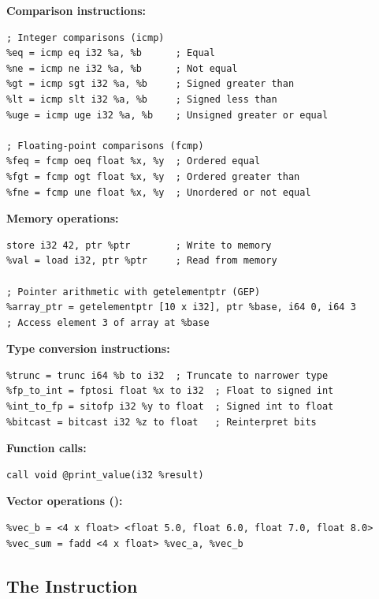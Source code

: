 \textbf{Comparison instructions:}

\begin{lstlisting}[style=ir]
; Integer comparisons (icmp)
%eq = icmp eq i32 %a, %b      ; Equal
%ne = icmp ne i32 %a, %b      ; Not equal
%gt = icmp sgt i32 %a, %b     ; Signed greater than
%lt = icmp slt i32 %a, %b     ; Signed less than
%uge = icmp uge i32 %a, %b    ; Unsigned greater or equal

; Floating-point comparisons (fcmp)
%feq = fcmp oeq float %x, %y  ; Ordered equal
%fgt = fcmp ogt float %x, %y  ; Ordered greater than
%fne = fcmp une float %x, %y  ; Unordered or not equal
\end{lstlisting}

\textbf{Memory operations:}

\begin{lstlisting}[style=ir]
%ptr = alloca i32             ; Stack allocation
store i32 42, ptr %ptr        ; Write to memory
%val = load i32, ptr %ptr     ; Read from memory

; Pointer arithmetic with getelementptr (GEP)
%array_ptr = getelementptr [10 x i32], ptr %base, i64 0, i64 3
; Access element 3 of array at %base
\end{lstlisting}

\textbf{Type conversion instructions:}

\begin{lstlisting}[style=ir]
%ext = zext i32 %a to i64     ; Zero-extend to wider type
%trunc = trunc i64 %b to i32  ; Truncate to narrower type
%fp_to_int = fptosi float %x to i32  ; Float to signed int
%int_to_fp = sitofp i32 %y to float  ; Signed int to float
%bitcast = bitcast i32 %z to float   ; Reinterpret bits
\end{lstlisting}

\textbf{Function calls:}

\begin{lstlisting}[style=ir]
%result = call i32 @compute(i32 %x, i32 %y)
call void @print_value(i32 %result)
\end{lstlisting}

\textbf{Vector operations ():}

\begin{lstlisting}[style=ir]
%vec_a = <4 x float> <float 1.0, float 2.0, float 3.0, float 4.0>
%vec_b = <4 x float> <float 5.0, float 6.0, float 7.0, float 8.0>
%vec_sum = fadd <4 x float> %vec_a, %vec_b
\end{lstlisting}

\subsection{The  Instruction}


